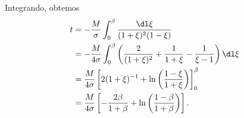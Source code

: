 Integrando, obtemos
\begin{align*}
    t &= -\frac{M}{\sigma} \int_0^\beta \frac{\dl\xi}{(1+\xi)^2(1-\xi)}\\
      &= -\frac{M}{4\sigma} \int_0^\beta \left(\frac{2}{(1+\xi)^2} + \frac{1}{1+\xi} - \frac{1}{\xi - 1}\right)\dl\xi\\
      &= \frac{M}{4 \sigma} \left[2(1+\xi)^{-1} + \ln{\left(\frac{1-\xi}{1+\xi}\right)}\right]_0^\beta\\
      &= \frac{M}{4 \sigma} \left[-\frac{2\beta}{1+\beta} + \ln{\left(\frac{1-\beta}{1+\beta}\right)}\right].
\end{align*}
